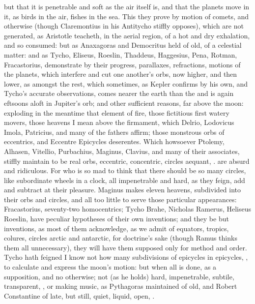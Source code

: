 {but that it is penetrable and soft as the air itself is, and that
the planets move in it, as birds in the air, fishes in the sea. This
they prove by motion of comets, and otherwise (though Claremontius in
his Antitycho stiffly opposes), which are not generated, as Aristotle
teacheth, in the aerial region, of a hot and dry exhalation, and so
consumed: but as Anaxagoras and Democritus held of old, of a celestial
matter: and as  Tycho, Eliseus, Roeslin, Thaddeus,
Haggesius, Pena, Rotman, Fracastorius, demonstrate by their progress,
parallaxes, refractions, motions of the planets, which interfere and
cut one another's orbs, now higher, and then lower, as  amongst the
rest, which sometimes, as Kepler confirms by his own, and Tycho's
accurate observations, comes nearer the earth than the  and is again
eftsoons aloft in Jupiter's orb; and other sufficient reasons,
far above the moon: exploding in the meantime that element of fire,
those fictitious first watery movers, those heavens I mean above the
firmament, which Delrio, Lodovicus Imola, Patricius, and many of the
fathers affirm; those monstrous orbs of eccentrics, and Eccentre
Epicycles deserentes. Which howsoever Ptolemy, Alhasen, Vitellio,
Purbachius, Maginus, Clavius, and many of their associates, stiffly
maintain to be real orbs, eccentric, concentric, circles aequant, \etc{}.
are absurd and ridiculous. For who is so mad to think that there should
be so many circles, like subordinate wheels in a clock, all
impenetrable and hard, as they feign, add and subtract at their
pleasure. Maginus makes eleven heavens, subdivided into their
orbs and circles, and all too little to serve those particular
appearances: Fracastorius, seventy-two homocentrics; Tycho Brahe,
Nicholas Ramerus, Heliseus Roeslin, have peculiar hypotheses of their
own inventions; and they be but inventions, as most of them
acknowledge, as we admit of equators, tropics, colures, circles arctic
and antarctic, for doctrine's sake (though Ramus thinks them all
unnecessary), they will have them supposed only for method and order.
Tycho hath feigned I know not how many subdivisions of epicycles in
epicycles, \etc{}, to calculate and express the moon's motion: but when
all is done, as a supposition, and no otherwise; not (as he holds)
hard, impenetrable, subtile, transparent, \etc{}, or making music, as
Pythagoras maintained of old, and Robert Constantine of late, but
still, quiet, liquid, open, \etc{}.
}
